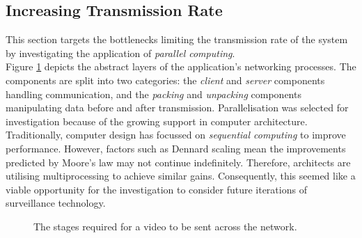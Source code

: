 \subsection{Increasing Transmission Rate}
\label{sec:parallelisation}
\indent \indent
This section targets the bottlenecks limiting the transmission rate of the system by investigating the application of \textit{parallel computing}.
\smallskip \\ \indent
Figure \ref{fig:parallelStack} depicts the abstract layers of the application's networking processes. The components are split into two categories: the \textit{client} and \textit{server} components handling communication, and the \textit{packing} and \textit{unpacking} components manipulating data before and after transmission. Parallelisation was selected for investigation because of the growing support in computer architecture. Traditionally, computer design has focussed on \textit{sequential computing} to improve performance. However, factors such as Dennard scaling \cite{Dennard} mean the improvements predicted by Moore's law \cite{Moore} may not continue indefinitely. Therefore, architects are utilising multiprocessing to achieve similar gains. Consequently, this seemed like a viable opportunity for the investigation to consider future iterations of surveillance technology.
\begin{figure}[h!]
    \centering
    \scalebox{0.4}{}
    \captionsetup{justification=centering}
    \caption[Abstract view of parallel processes]{The stages required for a video to be sent across the network.}
    \label{fig:parallelStack}
\end{figure}

